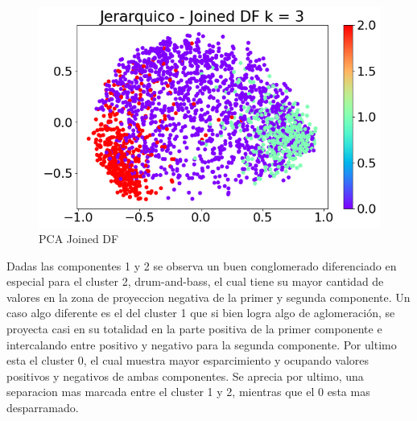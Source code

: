 \begin{figure}[H]
    \centering
    \includegraphics[width=\textwidth]{img/imagenes/jerarquico_AA/pca_joinedDF_3clusters.png}
    \caption{PCA Joined DF}
    \label{fig:pcaJoinedDF}
\end{figure}

Dadas las componentes 1 y 2 se observa un buen conglomerado diferenciado en especial para el cluster 2, drum-and-bass, el cual tiene su mayor cantidad de valores en la zona de proyeccion negativa de la primer y segunda componente. Un caso algo diferente es el del cluster 1 que si bien logra algo de aglomeración, se proyecta casi en su totalidad en la parte positiva de la primer componente e intercalando entre positivo y negativo para la segunda componente. Por ultimo esta el cluster 0, el cual muestra mayor esparcimiento y ocupando valores positivos y negativos de ambas componentes.
Se aprecia por ultimo, una separacion mas marcada entre el cluster 1 y 2, mientras que el 0 esta mas desparramado.

